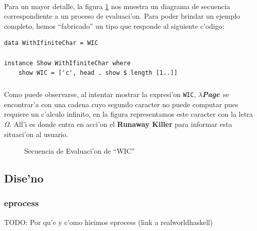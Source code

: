 \documentclass[a4paper]{article}
\newcommand{\hpage}{\textbf{\textsl{$\lambda$Page}}}
\begin{document}
\paragraph{}Para un mayor detalle, la figura \ref{seq1} nos muestra un diagrama de secuencia correspondiente a un proceso de evaluaci'on.  Para poder brindar un ejemplo completo, hemos ``fabricado'' un tipo que responde al siguiente c'odigo:
\lstset{language=haskell, frame=single, tabsize=4}
\begin{lstlisting}
data WithIfiniteChar = WIC

instance Show WithIfiniteChar where
    show WIC = ['c', head . show $ length [1..]]
\end{lstlisting}
\subparagraph{}Como puede observarse, al intentar mostrar la expresi'on \texttt{WIC}, \hpage\ se encontrar'a con una cadena cuyo segundo caracter no puede computar pues requiere un c'alculo infinito, en la figura representamos este caracter con la letra $\Omega$.  All'i es donde entra en acci'on el \textbf{Runaway Killer} para informar esta situaci'on al usuario.
\begin{figure}[htbp]
	\begin{center}
		\caption{Secuencia de Evaluaci'on de ``WIC''}
		\label{seq1}
	\end{center}
\end{figure}

\subsection{Dise'no}
\begin{epigraphs}
\end{epigraphs}
\subsubsection{eprocess} TODO: Por qu'e y c'omo hicimos eprocess (link a realworldhaskell)
\end{document}

